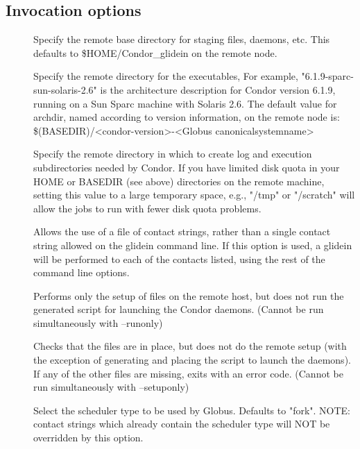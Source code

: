 \subsection{Invocation options}
\begin{description}
\item[]
	Specify the remote base directory for staging files, daemons, etc. 
	This defaults to \$HOME/Condor\_glidein on the remote node.

\item[]
	Specify the remote directory for the executables, 
	For example, "6.1.9-sparc-sun-solaris-2.6" is the architecture description 
	for Condor version 6.1.9, running on a Sun Sparc machine with Solaris 2.6. 
	The default value for archdir, named according to version information, on 
	the remote node is:
	\$(BASEDIR)/<condor-version>-<Globus canonicalsystemname>

\item[]
	Specify the remote directory in which to create log and execution 
	subdirectories needed by Condor. If you have limited disk quota in your 
	HOME or BASEDIR (see above) directories on the remote machine, setting 
	this value to a large temporary space, e.g., "/tmp" or "/scratch" 
	will allow the jobs to run with fewer disk quota problems.

\item[]
	Allows the use of a file of contact strings, rather than a single
	contact string allowed on the glidein command line. If this option
	is used, a glidein will be performed to each of the contacts listed,
	using the rest of the command line options.

\item[]
   Performs only the setup of files on the remote host, but does not
   run the generated script for launching the Condor daemons.
   (Cannot be run simultaneously with --runonly)

\item[]
   Checks that the files are in place, but does not do the remote setup
   (with the exception of generating and placing the script to launch
   the daemons). If any of the other files are missing, exits with
   an error code.
   (Cannot be run simultaneously with --setuponly)

\item[]
	Select the scheduler type to be used by Globus. Defaults to "fork".
	NOTE: contact strings which already contain the scheduler type will NOT
	be overridden by this option.


\end{description}

